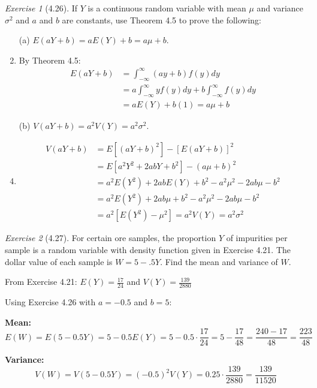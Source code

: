 \documentclass[12pt]{amsart}
\makeatletter
\theoremstyle{remark}
\newtheorem*{exercise}{Exercise}%
\renewenvironment{proof}[1][\proofname]{\par\doublespacing
  \pushQED{\qed}%
  \normalfont \topsep6\p@\@plus6\p@\relax
  \list{}{%
    \settowidth{\leftmargin}{\itshape\proofname:\hskip\labelsep}%
    \setlength{\labelwidth}{0pt}%
    \setlength{\itemindent}{-\leftmargin}%
  }%
  \item[\hskip\labelsep\itshape#1\@addpunct{:}]\ignorespaces
}{%
  \popQED\endlist\@endpefalse
  \singlespacing
}
\theoremstyle{mycomment}
\makeatother
\begin{document}
\begin{exercise}[4.26]
If $Y$ is a continuous random variable with mean $\mu$ and variance $\sigma^2$ and $a$ and $b$ are constants, use Theorem 4.5 to prove the following:

\begin{enumerate}
    \item[(a)] $E(aY + b) = aE(Y) + b = a\mu + b$.
\begin{proof}[Solution]
By Theorem 4.5:
\begin{align*}
E(aY + b) &= \int_{-\infty}^{\infty} (ay + b)f(y) dy \\
&= a\int_{-\infty}^{\infty} y f(y) dy + b\int_{-\infty}^{\infty} f(y) dy \\
&= aE(Y) + b(1) = a\mu + b
\end{align*}
\end{proof}

    \item[(b)] $V(aY + b) = a^2V(Y) = a^2\sigma^2$.
\begin{proof}[Solution]
\begin{align*}
V(aY + b) &= E[(aY + b)^2] - [E(aY + b)]^2 \\
&= E[a^2Y^2 + 2abY + b^2] - (a\mu + b)^2 \\
&= a^2E(Y^2) + 2abE(Y) + b^2 - a^2\mu^2 - 2ab\mu - b^2 \\
&= a^2E(Y^2) + 2ab\mu + b^2 - a^2\mu^2 - 2ab\mu - b^2 \\
&= a^2[E(Y^2) - \mu^2] = a^2V(Y) = a^2\sigma^2
\end{align*}
\end{proof}
\end{enumerate}
\end{exercise}
\begin{exercise}[4.27]
For certain ore samples, the proportion $Y$ of impurities per sample is a random variable with density function given in Exercise 4.21. The dollar value of each sample is $W = 5 - .5Y$. Find the mean and variance of $W$.

\begin{proof}[Solution]
From Exercise 4.21: $E(Y) = \frac{17}{24}$ and $V(Y) = \frac{139}{2880}$

Using Exercise 4.26 with $a = -0.5$ and $b = 5$:

\textbf{Mean:}
$$E(W) = E(5 - 0.5Y) = 5 - 0.5E(Y) = 5 - 0.5 \cdot \frac{17}{24} = 5 - \frac{17}{48} = \frac{240 - 17}{48} = \frac{223}{48}$$

\textbf{Variance:}
$$V(W) = V(5 - 0.5Y) = (-0.5)^2 V(Y) = 0.25 \cdot \frac{139}{2880} = \frac{139}{11520}$$
\end{proof}
\end{exercise}
\end{document}
